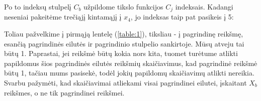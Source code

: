 \documentclass{article}
\begin{document}
\begin{table}[H]
    \centering
\end{table}
Po to indeksų stulpelį $C_b$ užpildome tikslo funkcijos $C_j$ indeksais. Kadangi neseniai pakeitėme trečiąjį kintamąjį į $x_4$, jo indeksas taip pat pasikeis į 5:
\begin{table}[H]
    \centering
\end{table}
Toliau pažvelkime į pirmąją lentelę (\ref{table:1}), tiksliau - į pagrindinę reikšmę, esančią pagrindinės eilutės ir pagrindinio stulpelio sankirtoje. Mūsų atveju tai būtų 1. Paprastai, jei reikšmė būtų kokia nors kita, tuomet turėtume atlikti papildomus šios pagrindinės eilutės reikšmių skaičiavimus, kad pagrindinė reikšmė būtų 1, tačiau mums pasisekė, todėl jokių papildomų skaičiavimų atlikti nereikia. Svarbu pažymėti, kad skaičiavimai atliekami visai pagrindinei eilutei, įskaitant $X_b$ reikšmes, o ne tik pagrindinei reikšmei.
\end{document}
